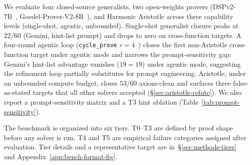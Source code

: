 We evaluate four closed-source generalists, two open-weights
provers (DSPv2-7B~\cite{dspv22025},
Goedel-Prover-V2-8B~\cite{goedelprover2025}), and Harmonic
Aristotle across three capability levels (single-shot, agentic,
unbounded). Single-shot generalist closure peaks at $22/60$
(Gemini, hint-list prompt) and drops to zero on cross-function
targets. A four-round agentic loop
(\texttt{cycle\_prove} $r{=}4$~\cite{opengauss2025}) closes
the first non-Aristotle cross-function target under agentic mode and narrows
the prompt-sensitivity gap: Gemini's hint-list advantage
vanishes ($19 = 19$) under agentic mode, suggesting the
refinement loop partially substitutes for prompt engineering.
Aristotle, under an unbounded compute budget, closes $53/60$
axiom-clean and surfaces three false-as-stated targets that
all other solvers accepted
(\S\ref{sec:aristotle-refute}). We also report a prompt-sensitivity
matrix and a T3 hint ablation
(Table~\ref{tab:prompt-sensitivity}).

The benchmark is organized into six tiers. T0--T3 are defined
by proof shape before any solver is run. T4 and T5 are empirical
failure categories assigned after evaluation. Tier details
and a representative target are in~\S\ref{sec:methods-tiers}
and Appendix~\ref{app:bench-format-fig}.
